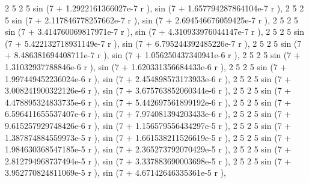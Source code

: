 \documentclass[a4paper,10pt]{article}
\begin{document}
\begin{eulernotebook}
\begin{eulercomment}
\begin{eulercomment}
\begin{eulercomment}
\begin{eulercomment}
\begin{eulercomment}
\begin{eulercomment}
\begin{eulercomment}
\begin{eulercomment}
\begin{eulercomment}
\begin{eulercomment}
\begin{eulercomment}
\begin{eulercomment}
\begin{eulercomment}
\begin{eulercomment}
\begin{eulercomment}
\begin{eulercomment}
\begin{eulercomment}
\begin{eulercomment}
\begin{eulercomment}
\begin{eulercomment}
\begin{eulercomment}
\begin{eulercomment}
\begin{eulercomment}
\begin{eulercomment}
\begin{eulercomment}
\begin{eulercomment}
\begin{eulercomment}
\begin{eulercomment}
\begin{euleroutput}
     2                         5      2                           5
  sin (7 + 1.2922161366027e-7 r ), sin (7 + 1.657794287864104e-7 r ), 
     2                           5      2                           5
  sin (7 + 2.117846778257662e-7 r ), sin (7 + 2.694546676059425e-7 r ), 
     2                           5      2                           5
  sin (7 + 3.414760069817971e-7 r ), sin (7 + 4.310933976044147e-7 r ), 
     2                           5      2                           5
  sin (7 + 5.422132718931149e-7 r ), sin (7 + 6.795244392485226e-7 r ), 
     2                           5      2                           5
  sin (7 + 8.486381694408711e-7 r ), sin (7 + 1.056250437340941e-6 r ), 
     2                          5      2                           5
  sin (7 + 1.31032937788846e-6 r ), sin (7 + 1.620331356684433e-6 r ), 
     2                           5      2                           5
  sin (7 + 1.997449452236024e-6 r ), sin (7 + 2.454898573173933e-6 r ), 
     2                           5      2                           5
  sin (7 + 3.008241900322126e-6 r ), sin (7 + 3.675763852060344e-6 r ), 
     2                           5      2                           5
  sin (7 + 4.478895324833735e-6 r ), sin (7 + 5.442697561899192e-6 r ), 
     2                           5      2                           5
  sin (7 + 6.596411655537407e-6 r ), sin (7 + 7.974081394203433e-6 r ), 
     2                           5      2                           5
  sin (7 + 9.615257929748426e-6 r ), sin (7 + 1.156579556434297e-5 r ), 
     2                           5      2                           5
  sin (7 + 1.387874884559973e-5 r ), sin (7 + 1.661538211526619e-5 r ), 
     2                           5      2                           5
  sin (7 + 1.984630368547185e-5 r ), sin (7 + 2.365273792070429e-5 r ), 
     2                           5      2                           5
  sin (7 + 2.812794968737494e-5 r ), sin (7 + 3.337883690003698e-5 r ), 
     2                           5      2                          5
  sin (7 + 3.952770824811069e-5 r ), sin (7 + 4.67142646335361e-5 r ), 

\end{euleroutput}
\end{eulercomment}
\end{eulercomment}
\end{eulercomment}
\end{eulercomment}
\end{eulercomment}
\end{eulercomment}
\end{eulercomment}
\end{eulercomment}
\end{eulercomment}
\end{eulercomment}
\end{eulercomment}
\end{eulercomment}
\end{eulercomment}
\end{eulercomment}
\end{eulercomment}
\end{eulercomment}
\end{eulercomment}
\end{eulercomment}
\end{eulercomment}
\end{eulercomment}
\end{eulercomment}
\end{eulercomment}
\end{eulercomment}
\end{eulercomment}
\end{eulercomment}
\end{eulercomment}
\end{eulercomment}
\end{eulercomment}
\end{eulernotebook}
\end{document}
